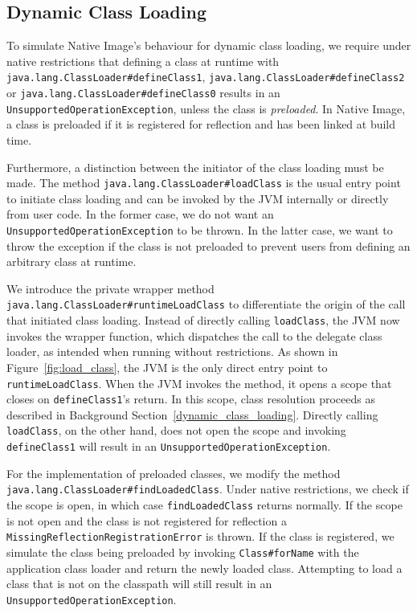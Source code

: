 \subsection{Dynamic Class Loading}
To simulate Native Image's behaviour for dynamic class loading, we require under native restrictions that defining a class at runtime with \verb|java.lang.ClassLoader#defineClass1|, \verb|java.lang.ClassLoader#defineClass2| or \verb|java.lang.ClassLoader#defineClass0| results in an \verb|UnsupportedOperationException|, unless the class is \emph{preloaded}. In Native Image, a class is preloaded if it is registered for reflection and has been linked at build time.

Furthermore, a distinction between the initiator of the class loading must be made. The method \verb|java.lang.ClassLoader#loadClass| is the usual entry point to initiate class loading and can be invoked by the JVM internally or directly from user code. In the former case, we do not want an \verb|UnsupportedOperationException| to be thrown. In the latter case, we want to throw the exception if the class is not preloaded to prevent users from defining an arbitrary class at runtime.

We introduce the private wrapper method \verb|java.lang.ClassLoader#runtimeLoadClass| to differentiate the origin of the call that initiated class loading. Instead of directly calling \verb|loadClass|, the JVM now invokes the wrapper function, which dispatches the call to the delegate class loader, as intended when running without restrictions. As shown in Figure~\ref{fig:load_class}, the JVM is the only direct entry point to \verb|runtimeLoadClass|. When the JVM invokes the method, it opens a scope that closes on \verb|defineClass1|'s return. In this scope, class resolution proceeds as described in Background Section~\ref{dynamic_class_loading}. 
Directly calling \verb|loadClass|, on the other hand, does not open the scope and invoking \verb|defineClass1| will result in an \verb|UnsupportedOperationException|.

For the implementation of preloaded classes, we modify the method \verb|java.lang.ClassLoader#findLoadedClass|.
Under native restrictions, we check if the scope is open, in which case \verb|findLoadedClass| returns normally. If the scope is not open and the class is not registered for reflection a \verb|MissingReflectionRegistrationError| is thrown. If the class is registered, we simulate the class being preloaded by invoking \verb|Class#forName| with the application class loader and return the newly loaded class. Attempting to load a class that is not on the classpath will still result in an \verb|UnsupportedOperationException|.

